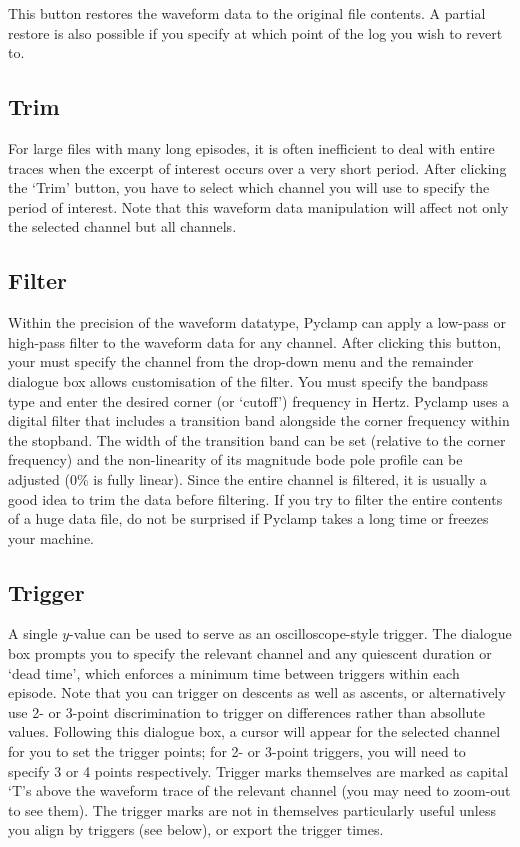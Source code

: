 \documentclass{article}
\begin{document}
This button restores the waveform data to the original file contents. A partial restore is also possible if you specify
at which point of the log you wish to revert to.

\subsection{Trim}

For large files with many long episodes, it is often inefficient to deal with entire traces when the excerpt of interest
occurs over a very short period. After clicking the `Trim' button, you have to select which channel you will use to
specify the period of interest. Note that this waveform data manipulation will affect not only the selected channel but
all channels.

\subsection{Filter}

Within the precision of the waveform datatype, Pyclamp can apply a low-pass or high-pass filter to the waveform data for
any channel. After clicking this button, your must specify the channel from the drop-down menu and the remainder
dialogue box allows customisation of the filter. You must specify the bandpass type and enter the desired corner (or
`cutoff') frequency in Hertz. Pyclamp uses a digital filter that includes a transition band alongside the corner
frequency within the stopband.  The width of the transition band can be set (relative to the corner frequency) and the
non-linearity of its magnitude bode pole profile can be adjusted (0\% is fully linear). Since the entire channel is
filtered, it is usually a good idea to trim the data before filtering. If you try to filter the entire contents of a
huge data file, do not be surprised if Pyclamp takes a long time or freezes your machine. 

\subsection{Trigger}

A single $y$-value can be used to serve as an oscilloscope-style trigger. The dialogue box prompts you to specify the
relevant channel and any quiescent duration or `dead time', which enforces a minimum time between triggers within each
episode. Note that you can trigger on descents as well as ascents, or alternatively use 2- or 3-point discrimination to
trigger on differences rather than absollute values. Following this dialogue box, a cursor will appear for the selected
channel for you to set the trigger points; for 2- or 3-point triggers, you will need to specify 3 or 4 points
respectively. Trigger marks themselves are marked as capital `T's above the waveform trace of the relevant channel (you
may need to zoom-out to see them). The trigger marks are not in themselves particularly useful unless you align by
triggers (see below), or export the trigger times.
\end{document}
